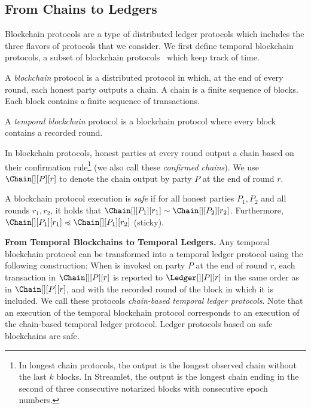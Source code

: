 \subsection{From Chains to Ledgers}

Blockchain protocols are a type of distributed ledger protocols which includes the three flavors of protocols that we consider.
We first define temporal blockchain protocols,
a subset of blockchain protocols~\cite{rethinking-consensus}
which keep track of time.

\begin{definition}
  A \emph{blockchain} protocol is a distributed protocol
  in which, at the end of every round, each honest party outputs
  a chain. A chain is a finite sequence of blocks. Each block
  contains a finite sequence of transactions.

  A \emph{temporal blockchain} protocol is a blockchain protocol
  where every block contains a recorded round.
\end{definition}

In blockchain protocols, honest parties at every round output a chain
based on their confirmation rule\footnote{
  In longest chain protocols, the output is the longest observed chain without the last $k$ blocks.
  In Streamlet, the output is the longest chain ending in the second of three consecutive notarized
  blocks with consecutive epoch numbers.
} (we also call these \emph{confirmed chains}).
We use $\Chain[][P][r]$ to denote the chain output
by party $P$ at the end of round $r$.

\begin{definition}
  A blockchain protocol execution is \emph{safe} if for
  all honest parties $P_1, P_2$ and all rounds $r_1, r_2$,
  it holds that $\Chain[][P_1][r_1] \sim \Chain[][P_2][r_2]$.
  Furthermore, $\Chain[][P_1][r_1] \preccurlyeq \Chain[][P_1][r_2]$ (sticky).
\end{definition}

\noindent
\textbf{From Temporal Blockchains to Temporal Ledgers.}
Any temporal blockchain protocol can be transformed into a
temporal ledger protocol using the following construction:
When \rread is invoked on party $P$ at the end of round $r$, each transaction in
$\Chain[][P][r]$ is reported to $\Ledger[][P][r]$ in the same order as in $\Chain[][P][r]$, and with
the recorded round of the block in which it is included.
We call these protocols \emph{chain-based temporal ledger protocols}.
Note that an execution of the temporal blockchain protocol corresponds to an execution of the chain-based temporal ledger protocol.
Ledger protocols based on safe blockchains are safe.

